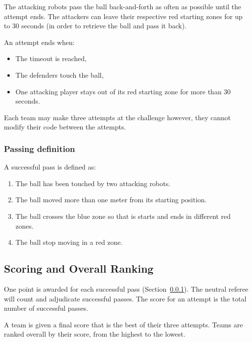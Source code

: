 The attacking robots pass the ball back-and-forth as often as possible until the attempt ends. The attackers can leave their respective red starting zones for up to 30 seconds (in order to retrieve the ball and pass it back).
    
An attempt ends when: 
\begin{itemize}
    \item[1] The timeout is reached,
    \item[2] The defenders touch the ball,
    \item[3] One attacking player stays out of its red starting zone for more than 30 seconds.
\end{itemize}

Each team may make three attempts at the challenge however, they cannot modify their code between the attempts.

\subsubsection{Passing definition}
\label{sec:pass-definition}
A successful pass is defined as:
\begin{enumerate}
    \item The ball has been touched by two attacking robots.
    \item The ball moved more than one meter from its starting position.
    \item The ball crosses the blue zone so that is starts and ends in different red zones.
    \item The ball stop moving in a red zone.
\end{enumerate}

\subsection{Scoring and Overall Ranking}
One point is awarded for each successful pass (\cf Section~\ref{sec:pass-definition}). The neutral referee will count and adjudicate successful passes. The score for an attempt is the total number of successful passes.

A team is given a final score that is the best of their three attempts. Teams are ranked overall by their score, from the highest to the lowest. 
